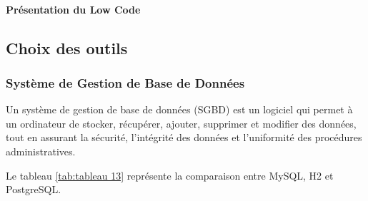 \documentclass[12pt]{report}
\begin{document}
				\paragraph{Présentation du Low Code}


				\subsection{Choix des outils}
				\subsubsection{Système de Gestion de Base de Données}

				\hspace{15pt} Un système de gestion de base de données (SGBD) est un logiciel qui permet à un ordinateur de stocker, récupérer, ajouter, supprimer et modifier des données, tout en assurant la sécurité, l'intégrité des données et l'uniformité des procédures administratives.


				Le tableau \ref{tab:tableau 13} représente la comparaison entre MySQL, H2 et PostgreSQL.
\end{document}
